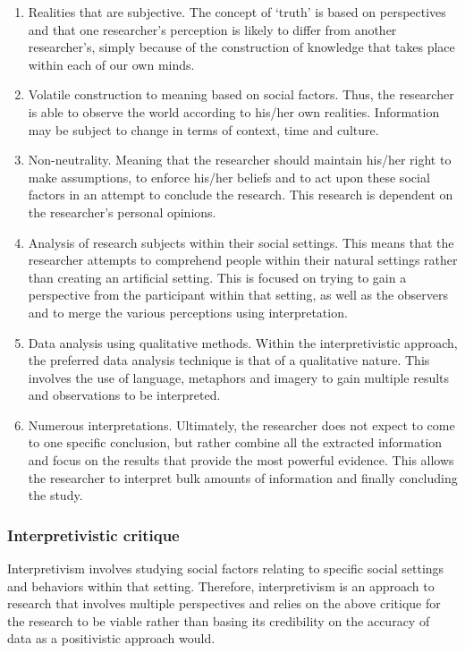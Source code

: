\begin{enumerate}[label=\roman*.]
\item Realities that are subjective. The concept of ‘truth’ is based on perspectives and that one researcher's perception is likely to differ from another researcher’s, simply because of the construction of knowledge that takes place within each of our own minds.
\item Volatile construction to meaning based on social factors. Thus, the researcher is able to observe the world according to his/her own realities. Information may be subject to change in terms of context, time and culture.
\item Non-neutrality. Meaning that the researcher should maintain his/her right to make assumptions, to enforce his/her beliefs and to act upon these social factors in an attempt to conclude the research. This research is dependent on the researcher’s personal opinions.
\item Analysis of research subjects within their social settings. This means that the researcher attempts to comprehend people within their natural settings rather than creating an artificial setting. This is focused on trying to gain a perspective from the participant within that setting, as well as the observers and to merge the various perceptions using interpretation.
\item Data analysis using qualitative methods. Within the interpretivistic approach, the preferred data analysis technique is that of a qualitative nature. This involves the use of language, metaphors and imagery to gain multiple results and observations to be interpreted.
\item Numerous interpretations. Ultimately, the researcher does not expect to come to one specific conclusion, but rather combine all the extracted information and focus on the results that provide the most powerful evidence. This allows the researcher to interpret bulk amounts of information and finally concluding the study.
\end{enumerate}

\subsubsection{Interpretivistic critique}
Interpretivism involves studying social factors relating to specific social settings and behaviors within that setting. Therefore, interpretivism is an approach to research that involves multiple perspectives and relies on the above critique for the research to be viable rather than basing its credibility on the accuracy of data as a positivistic approach would.
